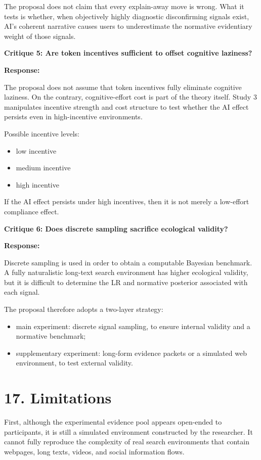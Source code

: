 The proposal does not claim that every explain-away move is wrong. What it tests is whether, when objectively highly diagnostic disconfirming signals exist, AI's coherent narrative causes users to underestimate the normative evidentiary weight of those signals.

\textbf{Critique 5: Are token incentives sufficient to offset cognitive laziness?}

\textbf{Response:}

The proposal does not assume that token incentives fully eliminate cognitive laziness. On the contrary, cognitive-effort cost is part of the theory itself. Study 3 manipulates incentive strength and cost structure to test whether the AI effect persists even in high-incentive environments.

Possible incentive levels:
\begin{itemize}[leftmargin=1.5em]
\item low incentive
\item medium incentive
\item high incentive
\end{itemize}

If the AI effect persists under high incentives, then it is not merely a low-effort compliance effect.

\textbf{Critique 6: Does discrete sampling sacrifice ecological validity?}

\textbf{Response:}

Discrete sampling is used in order to obtain a computable Bayesian benchmark. A fully naturalistic long-text search environment has higher ecological validity, but it is difficult to determine the LR and normative posterior associated with each signal.

The proposal therefore adopts a two-layer strategy:
\begin{itemize}[leftmargin=1.5em]
\item main experiment: discrete signal sampling, to ensure internal validity and a normative benchmark;
\item supplementary experiment: long-form evidence packets or a simulated web environment, to test external validity.
\end{itemize}

\section*{17. Limitations}

First, although the experimental evidence pool appears open-ended to participants, it is still a simulated environment constructed by the researcher. It cannot fully reproduce the complexity of real search environments that contain webpages, long texts, videos, and social information flows.

